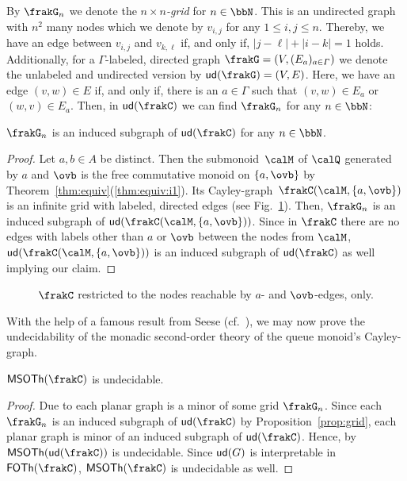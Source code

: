 By $\frakG_n$ we denote the \emph{$n\times n$-grid} for $n\in\bbN$. This is an undirected graph with $n^2$ many nodes which we denote by $v_{i,j}$ for any $1\leq i,j\leq n$. Thereby, we have an edge between $v_{i,j}$ and $v_{k,\ell}$ if, and only if, $|j-\ell|+|i-k|=1$ holds.
Additionally, for a $\varGamma$-labeled, directed graph $\frakG=(V,(E_a)_{a\in\varGamma})$ we denote the unlabeled and undirected version by $\ud{\frakG}=(V,E)$. Here, we have an edge $(v,w)\in E$ if, and only if, there is an $a\in\varGamma$ such that $(v,w)\in E_a$ or $(w,v)\in E_a$. Then, in $\ud{\cQ}$ we can find $\frakG_n$ for any $n\in\bbN$:

\begin{proposition}\label{prop:grid}
	$\frakG_n$ is an induced subgraph of $\ud{\cQ}$ for any $n\in\bbN$.
\end{proposition}
\begin{proof}
	Let $a,b\in A$ be distinct. Then the submonoid~$\calM$ of $\Qx$ generated by $a$ and $\ovb$ is the free commutative monoid on $\{a,\ovb\}$ by Theorem~\ref{thm:equiv}(\ref{thm:equiv:i1}). Its Cayley-graph~$\cayley{\calM}{\{a,\ovb\}}$ is an infinite grid with labeled, directed edges (see Fig.~\ref{fig:grid}). Then, $\frakG_n$ is an induced subgraph of $\ud{\cayley{\calM}{\{a,\ovb\}}}$. Since in $\cQ$ there are no edges with labels other than $a$ or $\ovb$ between the nodes from $\calM$, $\ud{\cayley{\calM}{\{a,\ovb\}}}$ is an induced subgraph of $\ud{\cQ}$ as well implying our claim.
\end{proof}

\begin{figure}
	\begin{center}
		
	\end{center}
	\caption{$\cQ$ restricted to the nodes reachable by $a$- and $\ovb$-edges, only.}\label{fig:grid}
\end{figure}

With the help of a famous result from Seese (cf.~\cite{See91}), we may now prove the undecidability of the monadic second-order theory of the queue monoid's Cayley-graph.

\begin{corollary}
	$\MSOTh{\cQ}$ is undecidable.
\end{corollary}
\begin{proof}
	Due to \cite{RobS84} each planar graph is a minor of some grid $\frakG_n$. Since each $\frakG_n$ is an induced subgraph of $\ud{\cQ}$ by Proposition~\ref{prop:grid}, each planar graph is minor of an induced subgraph of $\ud{\cQ}$. Hence, by \cite[Theorem~5]{See91} $\MSOTh{\ud{\cQ}}$ is undecidable. Since $\mathsf{ud}(G)$ is interpretable in $\FOTh{\cQ}$, $\MSOTh{\cQ}$ is undecidable as well.
\end{proof}